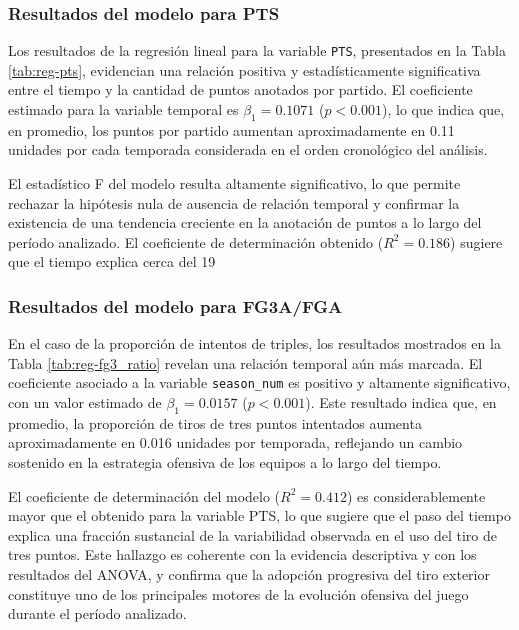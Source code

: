 \documentclass[12pt]{article}
\begin{document}
\subsubsection{Resultados del modelo para PTS}

Los resultados de la regresión lineal para la variable \texttt{PTS}, presentados en la Tabla \ref{tab:reg-pts}, evidencian una relación positiva y estadísticamente significativa entre el tiempo y la cantidad de puntos anotados por partido. El coeficiente estimado para la variable temporal es $\beta_1 = 0.1071$ ($p < 0.001$), lo que indica que, en promedio, los puntos por partido aumentan aproximadamente en 0.11 unidades por cada temporada considerada en el orden cronológico del análisis.

El estadístico F del modelo resulta altamente significativo, lo que permite rechazar la hipótesis nula de ausencia de relación temporal y confirmar la existencia de una tendencia creciente en la anotación de puntos a lo largo del período analizado. El coeficiente de determinación obtenido ($R^2 = 0.186$) sugiere que el tiempo explica cerca del 19%

\subsubsection{Resultados del modelo para FG3A/FGA}

En el caso de la proporción de intentos de triples, los resultados mostrados en la Tabla \ref{tab:reg-fg3_ratio} revelan una relación temporal aún más marcada. El coeficiente asociado a la variable \texttt{season\_num} es positivo y altamente significativo, con un valor estimado de $\beta_1 = 0.0157$ ($p < 0.001$). Este resultado indica que, en promedio, la proporción de tiros de tres puntos intentados aumenta aproximadamente en 0.016 unidades por temporada, reflejando un cambio sostenido en la estrategia ofensiva de los equipos a lo largo del tiempo.

El coeficiente de determinación del modelo ($R^2 = 0.412$) es considerablemente mayor que el obtenido para la variable PTS, lo que sugiere que el paso del tiempo explica una fracción sustancial de la variabilidad observada en el uso del tiro de tres puntos. Este hallazgo es coherente con la evidencia descriptiva y con los resultados del ANOVA, y confirma que la adopción progresiva del tiro exterior constituye uno de los principales motores de la evolución ofensiva del juego durante el período analizado.
\end{document}
